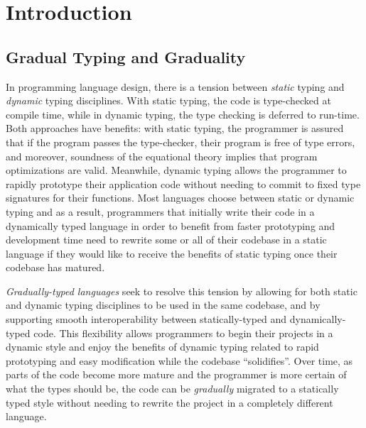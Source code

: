 \section{Introduction}
  
\subsection{Gradual Typing and Graduality}
In programming language design, there is a tension between \emph{static} typing
and \emph{dynamic} typing disciplines.
With static typing, the code is type-checked at compile time, while in dynamic typing,
the type checking is deferred to run-time. Both approaches have benefits: with static 
typing, the programmer is assured that if the program passes the type-checker, their
program is free of type errors, and moreover, soundness of the equational theory implies
that program optimizations are valid.
Meanwhile, dynamic typing allows the programmer to rapidly prototype
their application code without needing to commit to fixed type signatures for their
functions. Most languages choose between static or dynamic typing and as a result, programmers that initially write their code in a dynamically typed language
in order to benefit from faster prototyping and development time need to rewrite
some or all of their codebase in a static language if they would like to receive the benefits of static
typing once their codebase has matured.

\emph{Gradually-typed languages} \cite{siek-taha06, tobin-hochstadt06} seek to resolve this tension
by allowing for both static and dynamic typing disciplines to be used in the same codebase,
and by supporting smooth interoperability between statically-typed and dynamically-typed code.
This flexibility allows programmers to begin their projects in a dynamic style and
enjoy the benefits of dynamic typing related to rapid prototyping and easy modification
while the codebase ``solidifies''. Over time, as parts of the code become more mature
and the programmer is more certain of what the types should be, the code can be
\emph{gradually} migrated to a statically typed style without needing to
rewrite the project in a completely different language.


